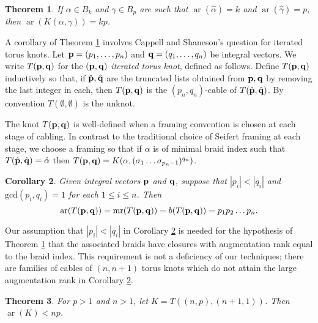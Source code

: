 \documentclass[11pt]{amsart}
\def\s{{\sigma}}
\def\ar{\operatorname{ar}}
\def\mr{\operatorname{mr}}
\newtheorem{thm}{Theorem}[section]
\newtheorem{cor}[thm]{Corollary}
\theoremstyle{definition}
\newtheorem{rem}[thm]{Remark}
\begin{document}
\begin{thm}\label{main}
If $\alpha\in B_k$ and $\gamma\in B_p$ are such that $\ar(\hat{\alpha})=k$ and $\ar(\hat{\gamma})=p$, then $\ar(K(\alpha,\gamma))=kp$.
\end{thm}

A corollary of Theorem \ref{main} involves Cappell and Shaneson's question for iterated torus knots. Let ${\bf p}=(p_1,\ldots,p_n)$ and ${\bf q}=(q_1,\ldots,q_n)$ be integral vectors. We write $T({\bf p},{\bf q})$ for the $({\bf p},{\bf q})$ \emph{iterated torus knot}, defined as follows. Define $T({\bf p},{\bf q})$ inductively so that, if $\hat{\bf p}, \hat{\bf q}$ are the truncated lists obtained from ${\bf p},{\bf q}$ by removing the last integer in each, then $T({\bf p},{\bf q})$ is the $(p_n,q_n)$-cable of $T(\hat{\bf p},\hat{\bf q})$. By convention $T(\emptyset,\emptyset)$ is the unknot.

The knot $T({\bf p},{\bf q})$ is well-defined when a framing convention is chosen at each stage of cabling. In contrast to the traditional choice of Seifert framing at each stage, we choose a framing so that if $\alpha$ is of minimal braid index such that $T(\hat{\bf p},\hat{\bf q}) = \hat{\alpha}$ then $T({\bf p},{\bf q}) = K(\alpha,(\s_1\ldots\s_{p_n-1})^{q_n})$.

\begin{cor}\label{cor:iteratedCables}
Given integral vectors ${\bf p}$ and ${\bf q}$, suppose that $|p_i|<|q_i|$ and $\text{gcd}(p_i,q_i)=1$ for each $1\le i\le n$. Then 
      \[\ar(T({\bf p},{\bf q}))=\mr(T({\bf p},{\bf q})) = b(T({\bf p},{\bf q}))=p_1p_2\ldots p_n.\]
\end{cor}

Our assumption that $|p_i|<|q_i|$ in Corollary \ref{cor:iteratedCables} is needed for the hypothesis of Theorem \ref{main} that the associated braids have closures with augmentation rank equal to the braid index. This requirement is not a deficiency of our techniques; there are families of cables of $(n,n+1)$ torus knots which do not attain the large augmentation rank in Corollary \ref{cor:iteratedCables}.

\begin{thm}\label{ThmNNPlus1}For $p>1$ and $n>1$, let $K=T((n,p),(n+1,1))$. Then $\ar(K) < np$.
\end{thm}
\end{document}

